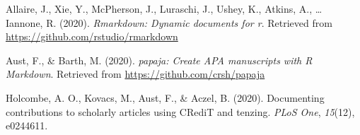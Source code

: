 \documentclass[
  ,jou,floatsintext]{apa6}
\newlength{\cslhangindent}
\newlength{\cslentryspacingunit} %
\newenvironment{CSLReferences}[2] %
 {%
  \setlength{\parindent}{0pt}
  \ifodd #1
  \let\oldpar\par
  \def\par{\hangindent=\cslhangindent\oldpar}
  \fi
  \setlength{\parskip}{#2\cslentryspacingunit}
 }%
 {}
\begin{document}
\hypertarget{refs}{}
\begin{CSLReferences}{1}{0}
\leavevmode{}%
Allaire, J., Xie, Y., McPherson, J., Luraschi, J., Ushey, K., Atkins, A., \ldots{} Iannone, R. (2020). \emph{Rmarkdown: Dynamic documents for r}. Retrieved from \url{https://github.com/rstudio/rmarkdown}

\leavevmode{}%
Aust, F., \& Barth, M. (2020). \emph{{papaja}: {Create} {APA} manuscripts with {R Markdown}}. Retrieved from \url{https://github.com/crsh/papaja}

\leavevmode{}%
Holcombe, A. O., Kovacs, M., Aust, F., \& Aczel, B. (2020). Documenting contributions to scholarly articles using CRediT and tenzing. \emph{PLoS One}, \emph{15}(12), e0244611.

\end{CSLReferences}
\end{document}
